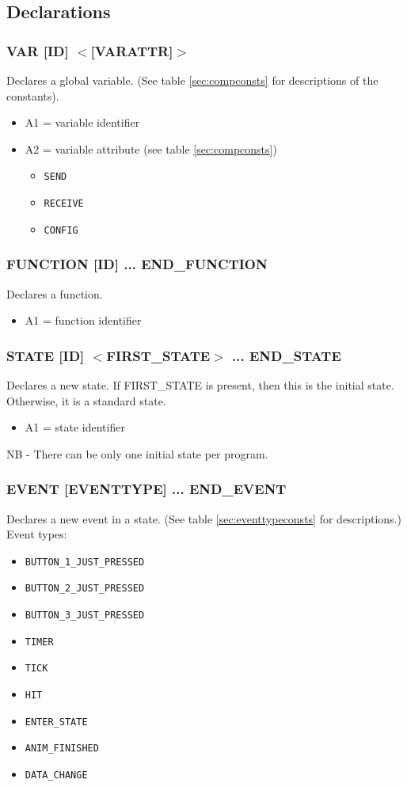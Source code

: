 \documentclass[12pt,a4paper]{scrbook}
\begin{document}
\subsection{Declarations}

\subsubsection{VAR [ID] $<$[VARATTR]$>$} 
Declares a global variable.  (See table \ref{sec:compconsts} for descriptions of the constants).
\begin{itemize}
\item A1 = variable identifier
\item A2 = variable attribute (see table \ref{sec:compconsts})
\begin{itemize}
\item \texttt{SEND}
\item \texttt{RECEIVE}
\item \texttt{CONFIG}
\end{itemize}
\end{itemize}

\subsubsection{FUNCTION [ID] ... END\_FUNCTION}
Declares a function.
\begin{itemize}
\item A1 = function identifier
\end{itemize}

\subsubsection{STATE [ID] $<$FIRST\_STATE$>$ ... END\_STATE}
Declares a new state.  If FIRST\_STATE is present, then this is the initial state.
Otherwise, it is a standard state.
\begin{itemize}
\item A1 = state identifier
\end{itemize}
NB - There can be only one initial state per program.

\subsubsection{EVENT [EVENTTYPE] ... END\_EVENT}
Declares a new event in a state.  (See table \ref{sec:eventtypeconsts} for descriptions.)
Event types:
\begin{itemize}
\item \texttt{BUTTON\_1\_JUST\_PRESSED}
\item \texttt{BUTTON\_2\_JUST\_PRESSED}
\item \texttt{BUTTON\_3\_JUST\_PRESSED}
\item \texttt{TIMER}
\item \texttt{TICK}
\item \texttt{HIT}
\item \texttt{ENTER\_STATE}
\item \texttt{ANIM\_FINISHED}
\item \texttt{DATA\_CHANGE}
\end{itemize}
\end{document}
